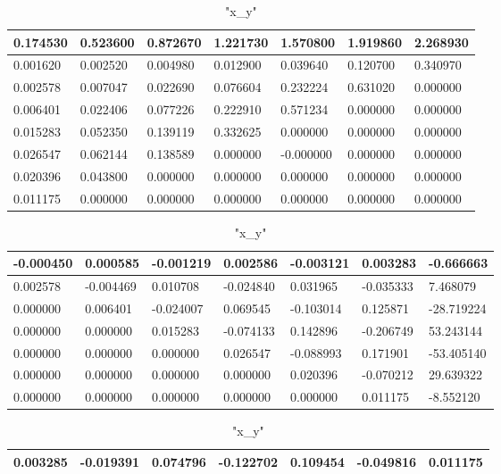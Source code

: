 \documentclass[12pt]{article}
\begin{document}
\begin{table}[h]
\caption { "x_y" }
\center
\begin{tabular} {|l|l|l|l|l|l|l|}
 \hline
 0.174530 & 0.523600 & 0.872670 & 1.221730 & 1.570800 & 1.919860 & 2.268930 \\ \hline 
 0.001620 & 0.002520 & 0.004980 & 0.012900 & 0.039640 & 0.120700 & 0.340970 \\ \hline 
 0.002578 & 0.007047 & 0.022690 & 0.076604 & 0.232224 & 0.631020 & 0.000000 \\ \hline 
 0.006401 & 0.022406 & 0.077226 & 0.222910 & 0.571234 & 0.000000 & 0.000000 \\ \hline 
 0.015283 & 0.052350 & 0.139119 & 0.332625 & 0.000000 & 0.000000 & 0.000000 \\ \hline 
 0.026547 & 0.062144 & 0.138589 & 0.000000 & -0.000000 & 0.000000 & 0.000000 \\ \hline 
 0.020396 & 0.043800 & 0.000000 & 0.000000 & 0.000000 & 0.000000 & 0.000000 \\ \hline 
 0.011175 & 0.000000 & 0.000000 & 0.000000 & 0.000000 & 0.000000 & 0.000000 \\ \hline 

\end{tabular}
\end{table} 
\begin{table}[h]
\caption { "x_y" }
\center
\begin{tabular} {|l|l|l|l|l|l|l|}
 \hline
 -0.000450 & 0.000585 & -0.001219 & 0.002586 & -0.003121 & 0.003283 & -0.666663 \\ \hline 
 0.002578 & -0.004469 & 0.010708 & -0.024840 & 0.031965 & -0.035333 & 7.468079 \\ \hline 
 0.000000 & 0.006401 & -0.024007 & 0.069545 & -0.103014 & 0.125871 & -28.719224 \\ \hline 
 0.000000 & 0.000000 & 0.015283 & -0.074133 & 0.142896 & -0.206749 & 53.243144 \\ \hline 
 0.000000 & 0.000000 & 0.000000 & 0.026547 & -0.088993 & 0.171901 & -53.405140 \\ \hline 
 0.000000 & 0.000000 & 0.000000 & 0.000000 & 0.020396 & -0.070212 & 29.639322 \\ \hline 
 0.000000 & 0.000000 & 0.000000 & 0.000000 & 0.000000 & 0.011175 & -8.552120 \\ \hline 

\end{tabular}
\end{table} 
\begin{table}[h]
\caption { "x_y" }
\center
\begin{tabular} {|l|l|l|l|l|l|l|}
 \hline
 0.003285 & -0.019391 & 0.074796 & -0.122702 & 0.109454 & -0.049816 & 0.011175 \\ \hline 

\end{tabular}
\end{table} 
\end{document}
